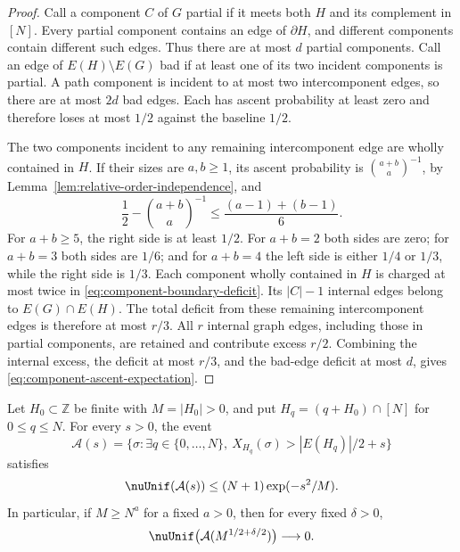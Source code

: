 \begin{proof}
Call a component \(C\) of \(G\) partial if it meets both \(H\)
and its complement in \([N]\).  Every partial component contains an
edge of \(\partial H\), and different components contain different
such edges.  Thus there are at most \(d\) partial components.
Call an edge of \(E(H)\setminus E(G)\) bad if at least one of its
two incident components is partial.  A path component is incident to
at most two intercomponent edges, so there are at most \(2d\) bad
edges.  Each has ascent probability at least zero and therefore loses
at most \(1/2\) against the baseline \(1/2\).

The two components incident to any remaining intercomponent edge are
wholly contained in \(H\).  If their sizes are \(a,b\ge1\), its
ascent probability is \(\binom{a+b}{a}^{-1}\), by
Lemma~\ref{lem:relative-order-independence}, and
\begin{equation}
\label{eq:component-boundary-deficit}
  \frac12-\binom{a+b}{a}^{-1}
  \le \frac{(a-1)+(b-1)}6.
\end{equation}
For \(a+b\ge5\), the right side is at least \(1/2\).
For \(a+b=2\) both sides are zero; for \(a+b=3\) both sides are
\(1/6\); and for \(a+b=4\) the left side is either \(1/4\)
or \(1/3\), while the right side is \(1/3\).
Each component wholly contained in \(H\) is charged at most twice
in \eqref{eq:component-boundary-deficit}.  Its \(|C|-1\) internal
edges belong to \(E(G)\cap E(H)\).  The total deficit from these
remaining intercomponent edges is therefore at most \(r/3\).
All \(r\) internal graph edges, including those in partial components,
are retained and contribute excess \(r/2\).  Combining the internal
excess, the deficit at most \(r/3\), and the bad-edge deficit at most
\(d\), gives \eqref{eq:component-ascent-expectation}.
\end{proof}

\begin{lemma}
\label{lem:uniform-ascent}
Let \(H_0\subset\mathbb Z\) be finite with \(M=|H_0|>0\),
and put \(H_q=(q+H_0)\cap[N]\) for \(0\le q\le N\).
For every \(s>0\), the event
\[
  \mathcal A(s)=
  \{\sigma:\exists q\in\{0,\ldots,N\},\
          X_{H_q}(\sigma)>|E(H_q)|/2+s\}
\]
satisfies
\begin{equation}
\label{eq:uniform-ascent-scan-finite}
  \nuUnif(\mathcal A(s))\le (N+1)\exp(-s^2/M).
\end{equation}
In particular, if \(M\ge N^a\) for a fixed \(a>0\), then for
every fixed \(\delta>0\),
\[
  \nuUnif\bigl(\mathcal A(M^{1/2+\delta/2})\bigr)\longrightarrow0.
\]
\end{lemma}

